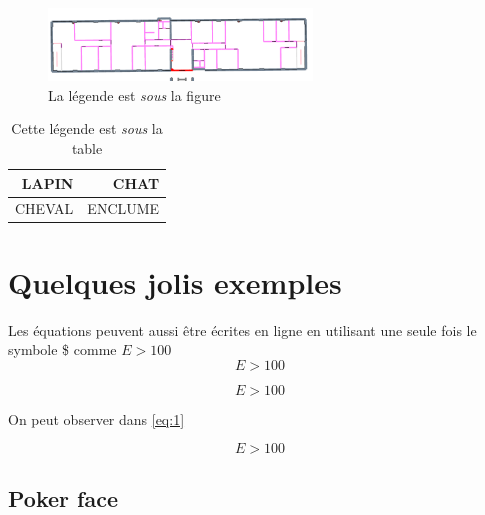 \documentclass[twocolumn,a4paper]{IEEEtranfr}
\begin{document}
{\begin{verbatim}
\end{verbatim}

\begin{figure}[htbp]
\begin{centering}
\par
\includegraphics[width=7cm]{Gs2.png}
\caption{La légende est \emph{sous} la figure}
\end{centering}
\end{figure}
%



\begin{table}[htbp]
\centering{}
\begin{tabular}{|r|r|}
\hline 
LAPIN & CHAT \\
\hline
CHEVAL  & ENCLUME \\
\hline
\end{tabular}
\caption{Cette légende  est \emph{sous} la table}
\end{table}
 
\section{Quelques jolis exemples}

Les équations peuvent aussi être écrites en ligne en utilisant une seule fois le symbole \$ comme $E>100$ $$E>100$$

\begin{equation}
E >100
\label{eq:1}
\end{equation}

On peut observer dans \ref{eq:1}}
\begin{equation*}
E >100
\end{equation*}

\subsection{Poker face}
\end{document}
